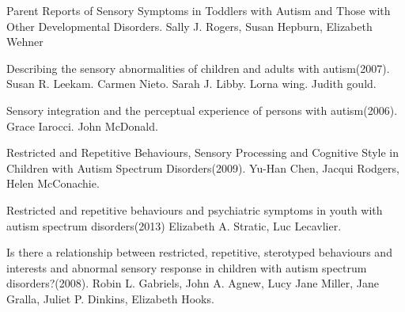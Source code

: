 \documentclass[11pt]{report}
\begin{document}
\begin{thebibliography}{9}
Parent Reports of Sensory Symptoms in Toddlers with Autism and Those with Other Developmental Disorders. Sally J. Rogers, Susan Hepburn, Elizabeth Wehner

Describing the sensory abnormalities of children and adults with autism(2007). Susan R. Leekam. Carmen Nieto. Sarah J. Libby. Lorna wing. Judith gould. 

Sensory integration and the perceptual experience of persons with autism(2006). Grace Iarocci. John McDonald.

Restricted and Repetitive Behaviours, Sensory Processing and Cognitive Style in Children with Autism Spectrum Disorders(2009). Yu-Han Chen, Jacqui Rodgers, Helen McConachie.

Restricted and repetitive behaviours and psychiatric symptoms in youth with autism spectrum disorders(2013) Elizabeth A. Stratic, Luc Lecavlier.

Is there a relationship between restricted, repetitive, sterotyped behaviours and interests and abnormal sensory response in children with autism spectrum disorders?(2008). Robin L. Gabriels, John A. Agnew, Lucy Jane Miller, Jane Gralla, Juliet P. Dinkins, Elizabeth Hooks.


\end{thebibliography}
\end{document}
